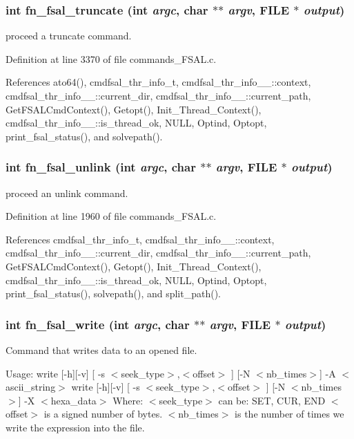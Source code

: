 \subsubsection{\setlength{\rightskip}{0pt plus 5cm}int fn\_\-fsal\_\-truncate (int {\em argc}, char $\ast$$\ast$ {\em argv}, FILE $\ast$ {\em output})}\label{commands_8h_a21}


proceed a truncate command. 

Definition at line 3370 of file commands\_\-FSAL.c.

References ato64(), cmdfsal\_\-thr\_\-info\_\-t, cmdfsal\_\-thr\_\-info\_\-\_\-::context, cmdfsal\_\-thr\_\-info\_\-\_\-::current\_\-dir, cmdfsal\_\-thr\_\-info\_\-\_\-::current\_\-path, Get\-FSALCmd\-Context(), Getopt(), Init\_\-Thread\_\-Context(), cmdfsal\_\-thr\_\-info\_\-\_\-::is\_\-thread\_\-ok, NULL, Optind, Optopt, print\_\-fsal\_\-status(), and solvepath().
\subsubsection{\setlength{\rightskip}{0pt plus 5cm}int fn\_\-fsal\_\-unlink (int {\em argc}, char $\ast$$\ast$ {\em argv}, FILE $\ast$ {\em output})}\label{commands_8h_a13}


proceed an unlink command. 

Definition at line 1960 of file commands\_\-FSAL.c.

References cmdfsal\_\-thr\_\-info\_\-t, cmdfsal\_\-thr\_\-info\_\-\_\-::context, cmdfsal\_\-thr\_\-info\_\-\_\-::current\_\-dir, cmdfsal\_\-thr\_\-info\_\-\_\-::current\_\-path, Get\-FSALCmd\-Context(), Getopt(), Init\_\-Thread\_\-Context(), cmdfsal\_\-thr\_\-info\_\-\_\-::is\_\-thread\_\-ok, NULL, Optind, Optopt, print\_\-fsal\_\-status(), solvepath(), and split\_\-path().
\subsubsection{\setlength{\rightskip}{0pt plus 5cm}int fn\_\-fsal\_\-write (int {\em argc}, char $\ast$$\ast$ {\em argv}, FILE $\ast$ {\em output})}\label{commands_8h_a26}


Command that writes data to an opened file.

Usage: write [-h][-v] [ -s $<$seek\_\-type$>$,$<$offset$>$ ] [-N $<$nb\_\-times$>$] -A $<$ascii\_\-string$>$ write [-h][-v] [ -s $<$seek\_\-type$>$,$<$offset$>$ ] [-N $<$nb\_\-times$>$] -X $<$hexa\_\-data$>$ Where: $<$seek\_\-type$>$ can be: SET, CUR, END $<$offset$>$ is a signed number of bytes. $<$nb\_\-times$>$ is the number of times we write the expression into the file.

